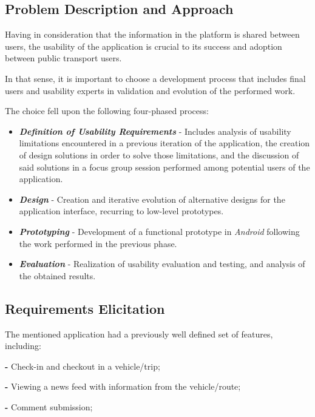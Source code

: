 \documentclass[9pt,a4paper]{extarticle}
\begin{document}
\begin{multicols}{2}
\section{Problem Description and Approach}\label{sec:work}

Having in consideration that the information in the platform is shared between users, the usability of the application is crucial to its success and adoption between public transport users.

In that sense, it is important to choose a development process that includes final users and usability experts in validation and evolution of the performed work.

The choice fell upon the following four-phased process:
\begin{itemize}
\item \textbf{\emph{Definition of Usability Requirements}} - Includes analysis of usability limitations encountered in a previous iteration of the application, the creation of design solutions in order to solve those limitations, and the discussion of said solutions in a focus group session performed among potential users of the application.

\item \textbf{\emph{Design}} - Creation and iterative evolution of alternative designs for the application interface, recurring to low-level prototypes.

\item \textbf{\emph{Prototyping}} - Development of a functional prototype in \emph{Android} following the work performed in the previous phase.

\item \textbf{\emph{Evaluation}} - Realization of usability evaluation and testing, and analysis of the obtained results.
\end{itemize}


\subsection{Requirements Elicitation}\label{sec:req}

The mentioned application had a previously well defined set of features, including:

\textbf{-} Check-in and checkout in a vehicle/trip;

\textbf{-} Viewing a news feed with information from the vehicle/route;

\textbf{-} Comment submission;


\end{multicols}
\end{document}
